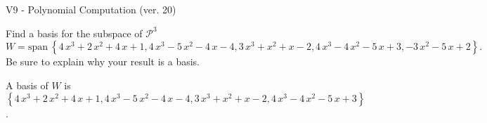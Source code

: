 \begin{exercise}
  \begin{exerciseTitle}V9 - Polynomial Computation (ver. 20)\end{exerciseTitle}
  \begin{exerciseStatement}
    Find a basis for the subspace of \(\mathcal{P}^3\) 
\[W=\mathrm{span}\ \left\{4 \, x^{3} + 2 \, x^{2} + 4 \, x + 1 , 4 \, x^{3} - 5 \, x^{2} - 4 \, x - 4 , 3 \, x^{3} + x^{2} + x - 2 , 4 \, x^{3} - 4 \, x^{2} - 5 \, x + 3 , -3 \, x^{2} - 5 \, x + 2\right\}.\]
 Be sure to explain why your result is a basis.


  \end{exerciseStatement}
  \begin{exerciseAnswer}
   A basis of \(W\) is  \(\left\{4 \, x^{3} + 2 \, x^{2} + 4 \, x + 1 , 4 \, x^{3} - 5 \, x^{2} - 4 \, x - 4 , 3 \, x^{3} + x^{2} + x - 2 , 4 \, x^{3} - 4 \, x^{2} - 5 \, x + 3\right\}\).
  


  \end{exerciseAnswer}
\end{exercise}